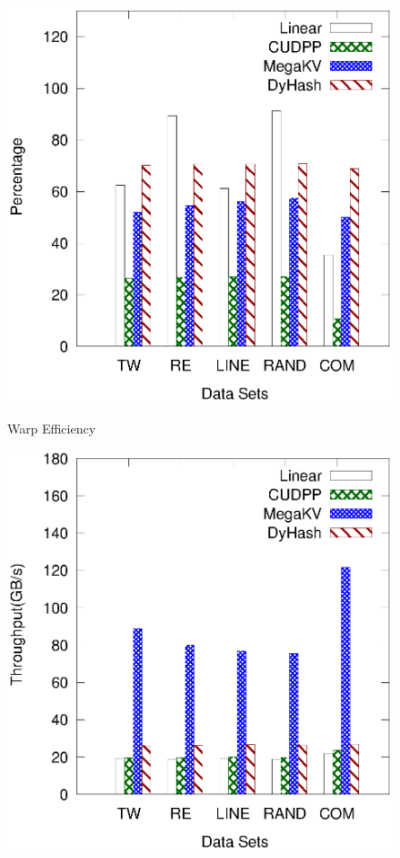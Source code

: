 \begin{figure}[h]
	\begin{minipage}{0.3\linewidth}\centering
		\includegraphics[width=\linewidth]{pic/static-profi/warp.eps}
		\centerline{Warp Efficiency}
	\end{minipage}
\hfill
\begin{minipage}{0.3\linewidth}\centering
	\includegraphics[width=\linewidth]{pic/static-profi/L2-read.eps}

\end{minipage}
\end{figure}
